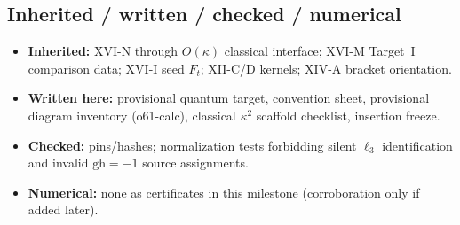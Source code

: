 \subsection{Inherited / written / checked / numerical}
\begin{itemize}
\item \textbf{Inherited:} XVI-N through $O(\kappa)$ classical interface; XVI-M Target~I
comparison data; XVI-I seed $F_t$; XII-C/D kernels; XIV-A bracket orientation.
\item \textbf{Written here:} provisional quantum target, convention sheet, provisional
diagram inventory (o61-calc), classical $\kappa^2$ scaffold checklist, insertion freeze.
\item \textbf{Checked:} pins/hashes; normalization tests forbidding silent $\ell_3$ identification
and invalid $\mathrm{gh}=-1$ source assignments.
\item \textbf{Numerical:} none as certificates in this milestone (corroboration only if added later).
\end{itemize}
